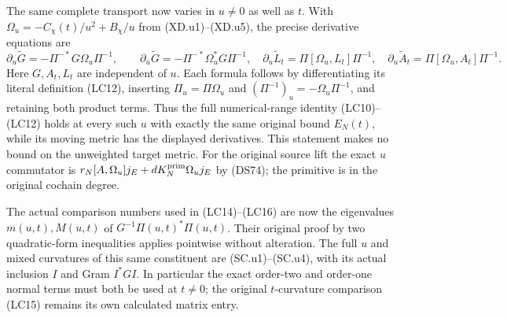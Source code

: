 
The same complete transport now varies in $u\ne0$ as well as $t$.
With $\Omega_u=-C_\chi(t)/u^2+B_\chi/u$ from (XD.u1)--(XD.u5),
the precise derivative equations are
\[
 \partial_u\widetilde G=-\Pi^{-*}G\Omega_u\Pi^{-1},\qquad
 \partial_{\bar u}\widetilde G=-\Pi^{-*}\Omega_u^*G\Pi^{-1},
 \quad
 \partial_u\widetilde L_t=\Pi[\Omega_u,L_t]\Pi^{-1},
 \quad
 \partial_u\widetilde A_t=\Pi[\Omega_u,A_t]\Pi^{-1}.
 \tag{LC.u1}
\]
Here $G,A_t,L_t$ are independent of $u$.  Each formula follows
by differentiating its literal definition (LC12), inserting
$\Pi_u=\Pi\Omega_u$ and
$(\Pi^{-1})_u=-\Omega_u\Pi^{-1}$, and retaining both product
terms.  Thus the full numerical-range identity (LC10)--(LC12)
holds at every such $u$ with exactly the same original bound
$E_N(t)$, while its moving metric has the displayed derivatives.
This statement makes no bound on the unweighted target metric.
For the original source lift the exact $u$ commutator is
$r_N[A,\Omega_u]j_E+dK_N^{\rm prim}\Omega_u j_E$
by (DS74); the primitive is in the original cochain degree.

The actual comparison numbers used in (LC14)--(LC16) are now
the eigenvalues $m(u,t),M(u,t)$ of
$G^{-1}\Pi(u,t)^*\Pi(u,t)$.  Their original proof by two
quadratic-form inequalities applies pointwise without alteration.
The full $u$ and mixed curvatures of this same constituent are
(SC.u1)--(SC.u4), with its actual inclusion $I$ and Gram $I^*GI$.
In particular the exact order-two and order-one normal terms
must both be used at $t\ne0$; the original $t$-curvature
comparison (LC15) remains its own calculated matrix entry.
